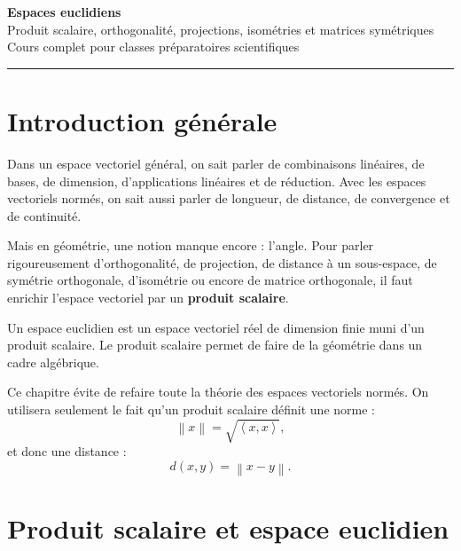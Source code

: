 \documentclass[11pt,a4paper]{article}
\newcommand{\norme}[1]{\left\lVert #1\right\rVert}
\newcommand{\scal}[2]{\left\langle #1,#2\right\rangle}
\begin{document}
\begin{center}
    {\Huge \textbf{Espaces euclidiens}}\\[2mm]
    {\Large Produit scalaire, orthogonalité, projections, isométries et matrices symétriques}\\[2mm]
    {\large Cours complet pour classes préparatoires scientifiques}\\[2mm]
    \rule{0.88\linewidth}{0.5pt}
\end{center}

\vspace{0.4cm}

\tableofcontents

\newpage

\section*{Introduction générale}

Dans un espace vectoriel général, on sait parler de combinaisons linéaires, de bases, de dimension, d'applications linéaires et de réduction.  
Avec les espaces vectoriels normés, on sait aussi parler de longueur, de distance, de convergence et de continuité.

Mais en géométrie, une notion manque encore : l'angle.  
Pour parler rigoureusement d'orthogonalité, de projection, de distance à un sous-espace, de symétrie orthogonale, d'isométrie ou encore de matrice orthogonale, il faut enrichir l'espace vectoriel par un \textbf{produit scalaire}.

\begin{retenirbox}
Un espace euclidien est un espace vectoriel réel de dimension finie muni d'un produit scalaire.  
Le produit scalaire permet de faire de la géométrie dans un cadre algébrique.
\end{retenirbox}

Ce chapitre évite de refaire toute la théorie des espaces vectoriels normés.  
On utilisera seulement le fait qu'un produit scalaire définit une norme :
\[
\norme{x}=\sqrt{\scal{x}{x}},
\]
et donc une distance :
\[
d(x,y)=\norme{x-y}.
\]

\section{Produit scalaire et espace euclidien}
\end{document}
